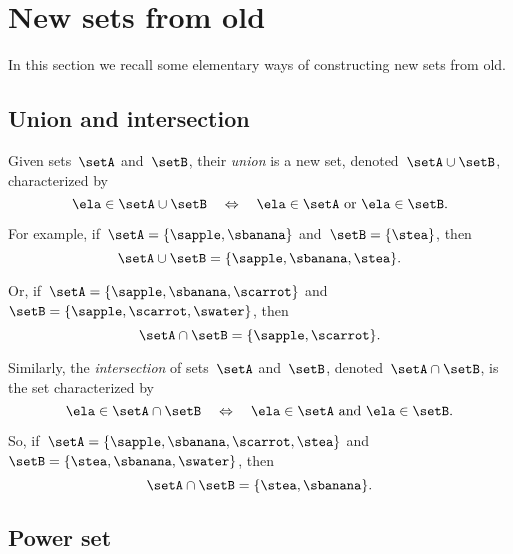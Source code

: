 
\section{New sets from old}

In this section we recall some elementary ways of constructing new sets from old.

\subsection{Union and intersection}

Given sets~$\setA$ and~$\setB$, their \emph{union} is a new set, denoted~$\setA \cup \setB$, characterized by
\begin{equation*}
    \ela \in \setA \cup \setB \quad \Leftrightarrow \quad \ela \in \setA \ \text{or} \ \ela \in \setB.
\end{equation*}

For example, if~$\setA = \{ \sapple, \sbanana \}$ and~$\setB = \{ \stea \}$, then
\begin{equation*}
    \setA \cup \setB = \{ \sapple, \sbanana, \stea \}.
\end{equation*}

Or, if~$\setA = \{ \sapple, \sbanana, \scarrot \}$ and~$\setB = \{ \sapple, \scarrot, \swater \}$, then
\begin{equation*}
    \setA \cap \setB = \{ \sapple, \scarrot \}.
\end{equation*}

Similarly, the \emph{intersection} of sets~$\setA$ and~$\setB$, denoted~$\setA \cap \setB$, is the set characterized by
\begin{equation*}
    \ela \in \setA \cap \setB \quad \Leftrightarrow \quad \ela \in \setA \ \text{and} \ \ela \in \setB.
\end{equation*}

So, if~$\setA = \{ \sapple, \sbanana, \scarrot, \stea \}$ and~$\setB = \{ \stea, \sbanana, \swater \}$, then
\begin{equation*}
    \setA \cap \setB = \{ \stea, \sbanana \}.
\end{equation*}


\subsection{Power set}
\label{sec:power-set}


